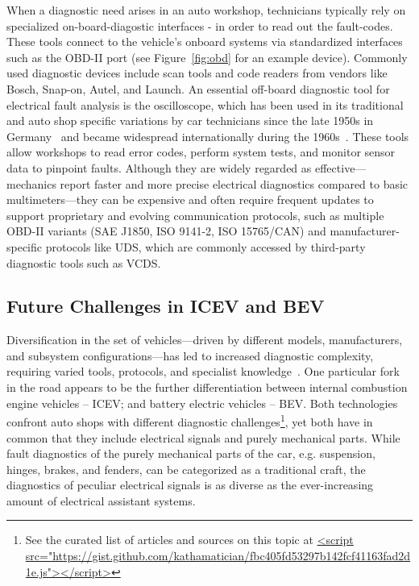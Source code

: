 When a diagnostic need arises in an auto workshop, technicians typically rely on specialized on-board-diagostic interfaces - in order to read out the fault-codes. 
These tools connect to the vehicle’s onboard systems via standardized interfaces such as the OBD-II port (see Figure~\ref{fig:obd} for an example device). 
Commonly used diagnostic devices include scan tools and code readers from vendors like Bosch, Snap-on, Autel, and Launch. 
An essential off-board diagnostic tool for electrical fault analysis is the oscilloscope, 
which has been used in its traditional and auto shop specific variations by car technicians since the late 1950s in Germany~\cite{hameg_history} and became widespread internationally during the 1960s~\cite{autoscope_hist}.
These tools allow workshops to read error codes, perform system tests, and monitor sensor data to pinpoint faults. 
Although they are widely regarded as effective—mechanics report faster and more precise electrical diagnostics compared to basic 
multimeters\cite{reddit_scope_efficiency}—they can be expensive and often require frequent updates to support proprietary and evolving communication protocols, 
such as multiple OBD-II variants (SAE J1850, ISO 9141-2, ISO 15765/CAN) and manufacturer-specific protocols like UDS, which are commonly accessed by third-party 
diagnostic tools such as VCDS\cite{obd2_protocols, obd2_wiki, vcds}.

\subsection{Future Challenges in ICEV and BEV}
Diversification in the set of vehicles—driven by different models, manufacturers, and subsystem configurations—has led to increased diagnostic complexity, 
requiring varied tools, protocols, and specialist knowledge~\cite{autodiagnostics_diversity, trid_diagnostic_complexity}. 
One particular fork in the road appears to be the further differentiation between internal combustion engine vehicles – ICEV; and battery electric vehicles – BEV. 
Both technologies confront auto shops with different diagnostic challenges\footnote{See the curated list of articles and sources on this topic at \url{<script src="https://gist.github.com/kathamatician/fbc405fd53297b142fcf41163fad2d1e.js"></script>}},  
yet both have in common that they include electrical signals and purely mechanical parts. 
While fault diagnostics of the purely mechanical parts of the car, e.g. suspension, hinges, brakes, and fenders, can be categorized as a traditional craft, 
the diagnostics of peculiar electrical signals is as diverse as the ever-increasing amount of electrical assistant systems. 

